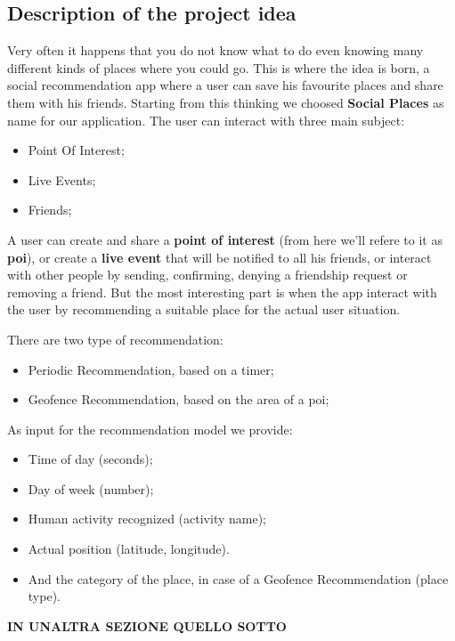 \documentclass[../../main]{subfiles}
\begin{document}
\label{ss:description-project-idea}
\subsection{Description of the project idea}
Very often it happens that you do not know what to do even knowing many different kinds of places where you could go.
This is where the idea is born, a social recommendation app where a user can save his favourite places and share them with his friends.
Starting from this thinking we choosed \textbf{Social Places} as name for our application.
The user can interact with three main subject:
\begin{itemize}
    \item Point Of Interest;
    \item Live Events;
    \item Friends;
\end{itemize}
A user can create and share a \textbf{point of interest} (from here we'll refere to it as \textbf{poi}), or create a \textbf{live event} that will be notified to all his friends, or interact with other people by sending, confirming, denying a friendship request or removing a friend.
But the most interesting part is when the app interact with the user by recommending a suitable place for the actual user situation.

There are two type of recommendation:
\begin{itemize}
    \item Periodic Recommendation, based on a timer;
    \item Geofence Recommendation, based on the area of a poi;
\end{itemize}
As input for the recommendation model we provide:
\begin{itemize}
    \item Time of day (seconds);
    \item Day of week (number);
    \item Human activity recognized (activity name);
    \item Actual position (latitude, longitude).
    \item And the category of the place, in case of a Geofence Recommendation (place type).
\end{itemize}
\textbf{IN UNALTRA SEZIONE QUELLO SOTTO}
\end{document}
